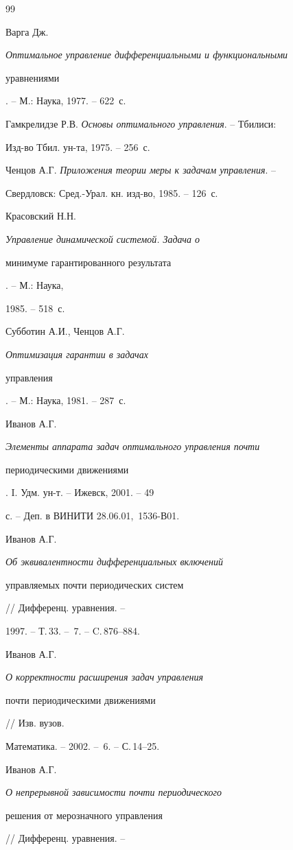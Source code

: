 \begin{thebibliography}{99}


Варга Дж. {\em Оптимальное управление дифференциальными и функциональными


уравнениями}. -- М.: Наука, 1977. -- 622~с.




Гамкрелидзе Р.В. {\em Основы оптимального управления}. -- Тбилиси:


Изд-во Тбил. ун-та, 1975. -- 256~с.




Ченцов А.Г. {\em Приложения теории меры к задачам управления}. --


Свердловск: Сред.-Урал. кн. изд-во, 1985. -- 126~с.




Красовский Н.Н. {\em Управление динамической системой. Задача о


минимуме гарантированного результата}. -- М.: Наука,


1985. -- 518~с.




Субботин А.И., Ченцов А.Г. {\em Оптимизация гарантии в задачах


управления}. -- М.: Наука, 1981. -- 287~с.




Иванов А.Г. {\em Элементы аппарата задач оптимального управления почти


периодическими движениями}. I. Удм. ун-т. -- Ижевск, 2001. -- 49


с. -- Деп. в ВИНИТИ 28.06.01, \No\,1536-В01.




Иванов А.Г. {\em Об эквивалентности дифференциальных включений


управляемых почти периодических систем} // Дифференц. уравнения. --


1997. -- Т.\,33. -- \No\,7. -- C.\,876--884.




Иванов А.Г. {\em О корректности расширения задач управления


почти периодическими движениями} // Изв. вузов.


Математика. -- 2002. -- \No\,6. -- С.\,14--25.




Иванов А.Г. {\em О непрерывной зависимости почти периодического


решения от мерозначного управления} // Дифференц. уравнения. --



\end{thebibliography}
